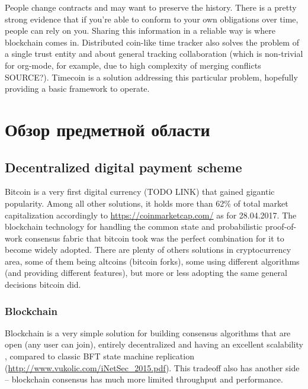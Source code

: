 \documentclass[]{itmo-student-thesis}
\begin{document}
People change contracts and may want to preserve the history. There is
a pretty strong evidence that if you’re able to conform to your own
obligations over time, people can rely on you. Sharing this
information in a reliable way is where blockchain comes
in. Distributed coin-like time tracker also solves the problem of a
single trust entity and about general tracking collaboration (which is
non-trivial for org-mode, for example, due to high complexity of
merging conflicts SOURCE?). Timecoin is a solution addressing this
particular problem, hopefully providing a basic framework to operate.


\chapter{Обзор предметной области}


\section{Decentralized digital payment scheme}

Bitcoin is a very first digital currency (TODO LINK) that gained
gigantic popularity. Among all other solutions, it holds more than
62\% of total market capitalization accordingly to
\url{https://coinmarketcap.com/} as for 28.04.2017. The blockchain
technology for handling the common state and probabilistic
proof-of-work consensus fabric that bitcoin took was the perfect
combination for it to become widely adopted. There are plenty of
others solutions in cryptocurrency area, some of them being altcoins
(bitcoin forks), some using different algorithms (and providing
different features), but more or less adopting the same general
decisions bitcoin did.

\subsection{Blockchain}

Blockchain is a very simple solution for building consensus algorithms
that are open (any user can join), entirely decentralized and having
an excellent scalability , compared to classic BFT state machine
replication (\url{http://www.vukolic.com/iNetSec_2015.pdf}). This tradeoff
also has another side -- blockchain consensus has much more limited
throughput and performance.
\end{document}
